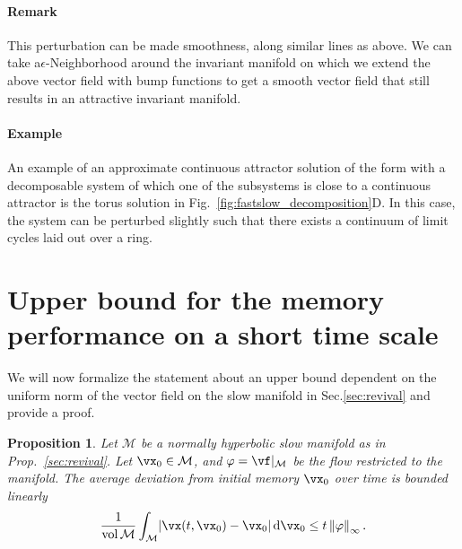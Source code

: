 \documentclass{article} %
\newcounter{ct}
\newcommand{\dm}[1]{\ensuremath{\mathrm{d}{#1}}} %
\newcommand{\manifold}{\mathcal{M}}
\newcommand{\uniformNorm}[1]{\left\|#1\right\|_\infty} %
\DeclarePairedDelimiter{\abs}{\lvert}{\rvert}
\newtheorem{prop}{Proposition}
\theoremstyle{definition}
\theoremstyle{remark}
\begin{document}
\paragraph{Remark}
This perturbation can be made smoothness, along similar lines as above.
We can take a\(\epsilon\)-Neighborhood around the invariant manifold on which we extend the above vector field with bump functions to get a smooth vector field that still results in an attractive invariant manifold.


\paragraph{Example}
An example of an approximate continuous attractor solution of the form with a decomposable system of which one of the subsystems is close to a continuous attractor is the torus solution in Fig.~\ref{fig:fastslow_decomposition}D.
In this case, the system can be perturbed slightly such that there exists a continuum of limit cycles laid out over a ring.




%











\newpage
\section{Upper bound for the memory performance on a short time scale}\label{sec:supp:ub}
We will now formalize the statement about an upper bound dependent on the uniform norm of the vector field on the slow manifold in Sec.\ref{sec:revival} and provide a proof.
\begin{prop}\label{prop:ub}
Let \(\manifold\) be a normally hyperbolic slow manifold as in Prop.~\ref{sec:revival}.
Let \(\vx_{0} \in \manifold\), and \(\varphi = \vf\vert_{\manifold}\) be the flow restricted to the manifold.
The average deviation from initial memory \(\vx_{0}\) over time is bounded linearly
\begin{align}
\frac{1}{\operatorname{vol}\manifold}\int_{\manifold}
\abs{\vx(t, \vx_{0}) - \vx_{0}}\,
\dm{\vx_{0}}
\leq t\uniformNorm{\varphi}.
\end{align}\end{prop}
\end{document}
